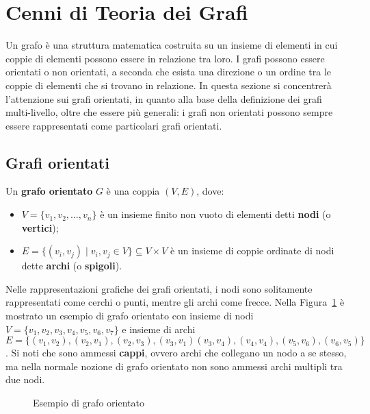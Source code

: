 \section{Cenni di Teoria dei Grafi}\label{sec:cenni-di-teoria-dei-grafi}

Un grafo \`e una struttura matematica costruita su un insieme di elementi in cui coppie di elementi possono essere
in relazione tra loro.
I grafi possono essere orientati o non orientati, a seconda che esista una direzione o un ordine tra le coppie
di elementi che si trovano in relazione.
In questa sezione si concentrerà l'attenzione sui grafi orientati, in quanto alla base della definizione dei
grafi multi-livello, oltre che essere più generali: i grafi non orientati possono sempre essere rappresentati
come particolari grafi orientati.

\subsection{Grafi orientati}\label{subsec:grafi-orientati}

\begin{definition}
    Un \textbf{grafo orientato} $G$ \`e una coppia $(V, E)$, dove:
    \begin{itemize}
        \item $V  = \{v_1, v_2, \ldots, v_n\}$ \`e un insieme finito non vuoto di elementi detti \textbf{nodi}
        (o \textbf{vertici});
        \item $E = \{(v_i, v_j) \mid v_i, v_j \in V\} \subseteq V \times V$ \`e un insieme di coppie ordinate di
        nodi dette \textbf{archi} (o \textbf{spigoli}).
    \end{itemize}
\end{definition}

Nelle rappresentazioni grafiche dei grafi orientati, i nodi sono solitamente rappresentati
come cerchi o punti, mentre gli archi come frecce.
Nella Figura~\ref{fig:directed-graph-example} \`e mostrato un esempio di grafo orientato con insieme di nodi
$V = \{v_1, v_2, v_3, v_4, v_5, v_6, v_7\}$ e insieme di archi $E = \{(v_1, v_2), (v_2, v_1), (v_2, v_3), (v_3, v_1)
(v_3, v_4), (v_4, v_4), (v_5, v_6), (v_6, v_5)\}$. \newline
Si noti che sono ammessi \textbf{cappi}, ovvero archi che collegano un nodo a se stesso, ma nella normale nozione
di grafo orientato non sono ammessi archi multipli tra due nodi.

\begin{figure}[t]
    \centering
    
    \vspace{-10pt}
    \caption{Esempio di grafo orientato}
    \label{fig:directed-graph-example}
\end{figure}

